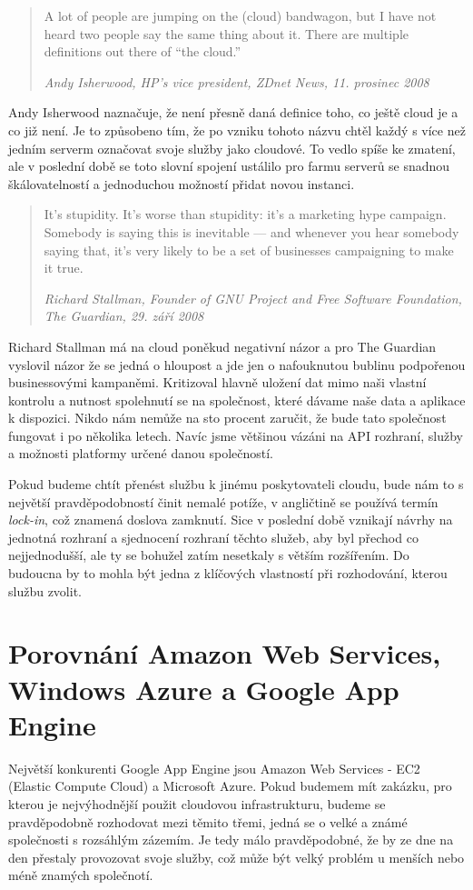 \begin{quotation}
A lot of people are jumping on the (cloud) bandwagon, but I have not heard two people say the same thing about it. There are multiple definitions out there of “the cloud.”

\em Andy Isherwood, HP’s vice president, ZDnet News, 11. prosinec 2008
\end{quotation}

Andy Isherwood naznačuje, že není přesně daná definice toho, co ještě cloud je a co již není. Je to způsobeno tím, že po vzniku tohoto názvu chtěl každý s více než jedním serverm označovat svoje služby jako cloudové. To vedlo spíše ke zmatení, ale v poslední době se toto slovní spojení ustálilo pro farmu serverů se snadnou škálovatelností a jednoduchou možností přidat novou instanci.

\begin{quotation}
It’s stupidity. It’s worse than stupidity: it’s a marketing hype campaign. Somebody is saying this is inevitable — and whenever you hear somebody saying that, it’s very likely to be a set of businesses campaigning to make it true.

\em Richard Stallman, Founder of GNU Project and Free Software Foundation, The Guardian, 29. září 2008
\end{quotation}

Richard Stallman má na cloud poněkud negativní názor a pro The Guardian vyslovil názor že se jedná o hloupost a jde jen o nafouknutou bublinu podpořenou businessovými kampaněmi. Kritizoval hlavně uložení dat mimo naši vlastní kontrolu a nutnost spolehnutí se na společnost, které dávame naše data a aplikace k dispozici. Nikdo nám nemůže na sto procent zaručit, že bude tato společnost fungovat i po několika letech. Navíc jsme většinou vázáni na API rozhraní, služby a možnosti platformy určené danou společností.

Pokud budeme chtít přenést službu k jinému poskytovateli cloudu, bude nám to s největší pravděpodobností činit nemalé potíže, v angličtině se používá termín \emph{lock-in}, což znamená doslova zamknutí. Sice v poslední době vznikají návrhy na jednotná rozhraní a sjednocení rozhraní těchto služeb, aby byl přechod co nejjednodušší, ale ty se bohužel zatím nesetkaly s větším rozšířením. Do budoucna by to mohla být jedna z klíčových vlastností při rozhodování, kterou službu zvolit.

\section{Porovnání Amazon Web Services, Windows Azure a Google App Engine}
Největší konkurenti Google App Engine jsou Amazon Web Services - EC2 (Elastic Compute Cloud) a Microsoft Azure. Pokud budemem mít zakázku, pro kterou je nejvýhodnější použit cloudovou infrastrukturu, budeme se pravděpodobně rozhodovat mezi těmito třemi, jedná se o velké a známé společnosti s rozsáhlým zázemím. Je tedy málo pravděpodobné, že by ze dne na den přestaly provozovat svoje služby, což může být velký problém u menších nebo méně znamých společnotí.


